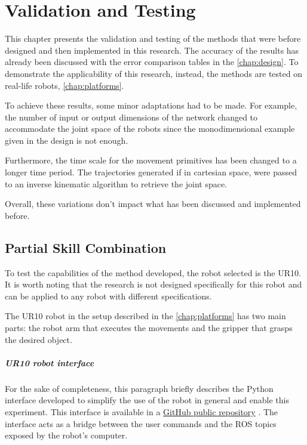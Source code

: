 \chapter{Validation and Testing} 
\label{chap:validation}

This chapter presents the validation and testing of the methods that were before designed and then implemented in this research. 
The accuracy of the results has already been discussed with the error comparison tables in the \cref{chap:design}.
To demonstrate the applicability of this research, instead, the methods are tested on real-life robots, \cref{chap:platforms}.

To achieve these results, some minor adaptations had to be made. For example, the number of input or output dimensions of the network changed to accommodate the joint space of the robots since the monodimensional example given in the design is not enough.

Furthermore, the time scale for the movement primitives has been changed to a longer time period.
The trajectories generated if in cartesian space, were passed to an inverse kinematic algorithm to retrieve the joint space.

Overall, these variations don't impact what has been discussed and implemented before. 

\newpage
\section{Partial Skill Combination}
To test the capabilities of the method developed, the robot selected is the UR10. It is worth noting that the research is not designed specifically for this robot and can be applied to any robot with different specifications. 

The UR10 robot in the setup described in the \cref{chap:platforms} has two main parts: the robot arm that executes the movements and the gripper that grasps the desired object. 

\paragraph{UR10 robot interface} For the sake of completeness, this paragraph briefly describes the Python interface developed to simplify the use of the robot in general and enable this experiment. This interface is available in a \href{https://github.com/igor-lirussi/UR10_robot_interface}{GitHub public repository} \cite{url:UR10repo}. 
The interface acts as a bridge between the user commands and the ROS topics exposed by the robot's computer. 

